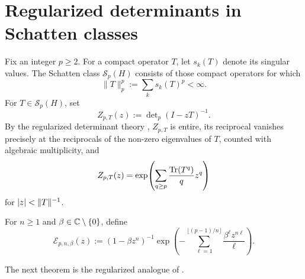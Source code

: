 \section{Regularized determinants in Schatten classes}
\label{sec:schatten}

Fix an integer \(p\ge 2\). For a compact operator \(T\), let
\(s_k(T)\) denote its singular values. The Schatten class
\(\mathcal S_p(H)\) consists of those compact operators for which
\[
  \|T\|_p^p:=\sum_k s_k(T)^p<\infty.
\]
For \(T\in \mathcal S_p(H)\), set
\[
  Z_{p,T}(z):=\det\nolimits_p(I-zT)^{-1}.
\]
By the regularized determinant theory
\cite[Chapter~9]{Simon2005TraceIdeals}, \(Z_{p,T}\) is entire, its
reciprocal vanishes precisely at the reciprocals of the non-zero
eigenvalues of \(T\), counted with algebraic multiplicity, and
\begin{equation}\label{eq:regularized-log-series}
  Z_{p,T}(z)
  =\exp\!\left(\sum_{q\ge p}\frac{\operatorname{Tr}(T^q)}{q}z^q\right)
\end{equation}
for \(\lvert z \rvert<\|T\|^{-1}\).

For \(n\ge 1\) and \(\beta\in \mathbb{C}\setminus\{0\}\), define
\begin{equation}\label{eq:regularized-euler-factor}
  \mathcal E_{p,n,\beta}(z)
  :=(1-\beta z^n)^{-1}
    \exp\!\left(
      -\sum_{\ell=1}^{\lfloor (p-1)/n\rfloor}
        \frac{\beta^\ell z^{n\ell}}{\ell}\right).
\end{equation}

The next theorem is the regularized analogue of
.

